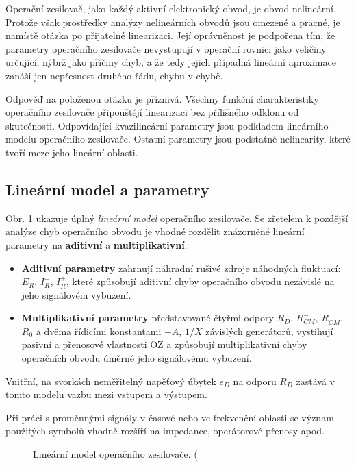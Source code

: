     Operační zesilovač, jako každý aktivní elektronický obvod, je obvod nelineární. Protože však
    prostředky analýzy nelineárních obvodů jsou omezené a pracné, je namístě otázka po přijatelné
    linearizaci. Její oprávněnost je podpořena tím, že parametry operačního zesilovače nevystupují v
    operační rovnici jako veličiny určující, nýbrž jako příčiny chyb, a že tedy jejich případná
    lineární aproximace zanáší jen nepřesnost druhého řádu, chybu v chybě.

    Odpověď na položenou otázku je příznivá. Všechny funkční charakteristiky operačního zesilovače
    připouštějí linearizaci bez přílišného odklonu od skutečnosti. Odpovídající kvazilineární
    parametry jsou podkladem lineárního modelu operačního zesilovače. Ostatní parametry jsou
    podstatné nelinearity, které tvoří meze jeho lineární oblasti.
    
    \subsection{Lineární model a parametry}\label{aesIchIIIsecIIssecI}
      Obr. \ref{aes:fig046} ukazuje úplný \emph{lineární model} operačního zesilovače. Se zřetelem k
      pozdější analýze chyb operačního obvodu je vhodné rozdělit znázorněné lineární parametry na
      \textbf{aditivní} a \textbf{multiplikativní}.
      \begin{itemize}[noitemsep]
        \item \textbf{Aditivní parametry} zahrnují náhradní rušivé zdroje náhodných fluktuací:
              \(E_R\), \(I_R^-\), \(I_R^+\), které způsobují aditivní chyby operačního obvodu
              nezávislé na jeho signálovém vybuzení.
        \item \textbf{Multiplikativní parametry} představované čtyřmi odpory \(R_D\), \(R^-_{CM}\),
              \(R^+_{CM}\), \(R_0\) a dvěma řídicími konstantami \(-A\), \(1/X\) závislých
              generátorů, vystihují pasivní a přenosové vlastnosti OZ a způsobují multiplikativní
              chyby operačních obvodu úměrné jeho signálovému vybuzení.
      \end{itemize}
      Vnitřní, na svorkách neměřitelný napěťový úbytek \(e_D\) na odporu \(R_D\) zastává v tomto
      modelu vazbu mezi vstupem a výstupem.
     
      Při práci s proměnnými signály v časové nebo ve frekvenční oblasti se význam použitých symbolů 
      vhodně rozšíří na impedance, operátorové přenosy apod.

      \begin{figure}[ht!] %
        \centering
        \caption{Lineární model operačního zesilovače. (\cite[s.~14]{Dostal}}
        \label{aes:fig046}
      \end{figure}

